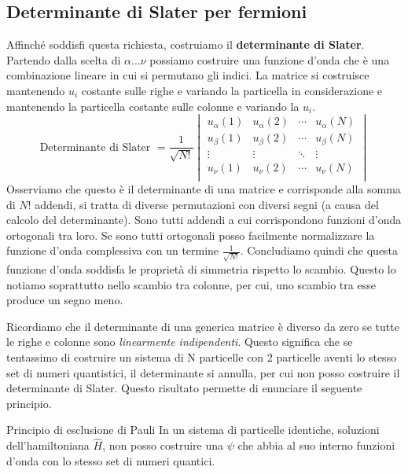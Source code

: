 \subsection{Determinante di Slater per fermioni}
\noindent Affinché soddisfi questa richiesta, costruiamo il \textbf{determinante di Slater}. Partendo dalla scelta di $\alpha \dots \nu$ possiamo costruire una funzione d'onda che è una combinazione lineare in cui si permutano gli indici. La matrice si costruisce mantenendo $u_i$ costante sulle righe e variando la particella in considerazione e mantenendo la particella costante sulle colonne e variando la $u_i$.
\begin{equation*}
    \text{Determinante di Slater }=
    \frac{1}{\sqrt{N!}}
    \begin{vmatrix}
        u_\alpha(1) & u_\alpha(2) & \cdots & u_\alpha(N) \\
        u_\beta(1) & u_\beta(2) & \cdots & u_\beta(N) \\
        \vdots & \vdots & \ddots & \vdots \\
        u_\nu(1) & u_\nu(2) & \cdots & u_\nu(N) \\
    \end{vmatrix}
\end{equation*}
Osserviamo che questo è il determinante di una matrice e corrisponde alla somma di $N!$ addendi, si tratta di diverse permutazioni con diversi segni (a causa del calcolo del determinante). Sono tutti addendi a cui corrispondono funzioni d'onda ortogonali tra loro. Se sono tutti ortogonali posso facilmente normalizzare la funzione d'onda complessiva con un termine $\frac{1}{\sqrt{N!}}$. Concludiamo quindi che questa funzione d'onda soddisfa le proprietà di simmetria rispetto lo scambio. Questo lo notiamo soprattutto nello scambio tra colonne, per cui, uno scambio tra esse produce un segno meno.

Ricordiamo che il determinante di una generica matrice è diverso da zero se tutte le righe e colonne sono \textit{linearmente indipendenti}. Questo significa che se tentassimo di costruire un sistema di N particelle con 2 particelle aventi lo stesso set di numeri quantistici, il determinante si annulla, per cui non posso costruire il determinante di Slater. Questo risultato permette di enunciare il seguente principio.

\begin{definition}{Principio di esclusione di Pauli}
    In un sistema di particelle identiche, soluzioni dell'hamiltoniana $\hat H$, non posso costruire una $\psi$ che abbia al suo interno funzioni d'onda con lo stesso set di numeri quantici.
\end{definition}

